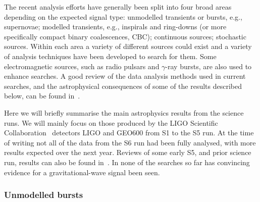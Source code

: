 \documentclass{article}
\begin{document}
The recent analysis efforts have generally been split into four broad areas
depending on the expected signal type: unmodelled transients or bursts, e.g.,
supernovae; modelled transients, e.g., inspirals and ring-downs (or more
specifically compact binary coalescences, CBC); continuous sources; stochastic
sources. Within each area a variety of different sources could exist and a
variety of analysis techniques have been developed to search for them. Some
electromagnetic sources, such as radio pulsars and $\gamma$-ray bursts, are also
used to enhance searches. A good review of the data analysis methods used in
current searches, and the astrophysical consequences of some of the results
described below, can be found in~\cite{Sathyaprakash:2009}.

Here we will briefly summarise the main astrophysics results from the science
runs. We will mainly focus on those produced by the LIGO Scientific
Collaboration~\cite{LSCweb} detectors LIGO and GEO600 from S1 to the S5 run.
At the time of writing not all of the data from the S6 run had been fully
analysed, with more results expected over the next year. Reviews of some early
S5, and prior science run, results can also be found in~\cite{Papa:2008,
Fairhurst:2009}. In none of the searches so far has convincing evidence for a
gravitational-wave signal been seen.

\subsubsection{Unmodelled bursts}
\label{subsubsection:unmodelled}
\end{document}

